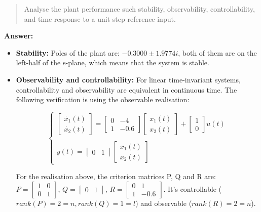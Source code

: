 \documentclass[12pt, oneside]{article}
\begin{document}
\begin{quote}    
Analyse the plant performance such stability, observability, controllability, and time response to a unit step reference input.
\end{quote}
\textbf{Answer:}
\begin{itemize}
    \item \textbf{Stability:}
    Poles of the plant are: $-0.3000\pm1.9774i$, both of them are on the left-half of the s-plane, which means that the system is stable.
    \item \textbf{Observability and controllability:} For linear time-invariant systems, controllability and observability are equivalent in continuous time. The following verification is using the observable realisation:

    \begin{equation}
        \begin{cases}
        \left[\begin{array}{ccc}\dot{x_1}(t)\\
        \dot{x_{2}}(t)\end{array}\right]
        =
        \left[\begin{array}{ccc} 0&-4\\
        1&-0.6\end{array}\right]
        \left[\begin{array}{ccc}x_1(t)\\
        x_2(t)\end{array}\right]
        +
        \left[\begin{array}{ccc}1\\
        0\end{array}\right]
        u(t)
        \\
        \\
        y(t)=
        \left[\begin{array}{ccc}0&1\end{array}\right]
        \left[\begin{array}{ccc}x_1(t)\\
        x_2(t)\end{array}\right]
        \end{cases}
    \end{equation}

    For the realisation above, the criterion matrices P, Q and R are:
    $P = \left[\begin{array}{ccc}1&0\\
        0&1\end{array}\right]$, $Q = \left[\begin{array}{ccc}0&1\end{array}\right]$, $R=\left[\begin{array}{ccc}0&1\\
        1&-0.6\end{array}\right]$. It's controllable ($rank(P)=2=n, rank(Q)=1=l$) and observable ($rank(R)=2=n$).


\end{itemize}
\end{document}
